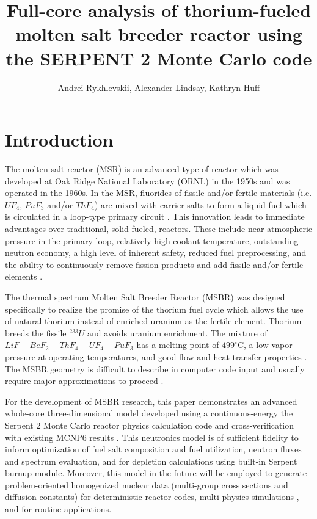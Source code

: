 \documentclass{anstrans}
\title{Full-core analysis of thorium-fueled molten salt breeder reactor using the SERPENT 2 Monte Carlo code}
\author{Andrei Rykhlevskii, Alexander Lindsay, Kathryn Huff}
\institute{
Department of Nuclear, Plasma, and Radiological Engineering, University of Illinois at Urbana-Champaign \break
Urbana, IL
}
\begin{document}
\section{Introduction}
The molten salt reactor (MSR) is an advanced type of reactor which was developed at Oak Ridge National Laboratory (ORNL) in the 1950s and was operated in the 1960s. In the MSR, fluorides of fissile and/or fertile materials (i.e. $UF_4$, $PuF_3$ and/or $ThF_4$) are mixed with carrier salts to form a liquid fuel which is circulated in a loop-type primary circuit \cite{haubenreich_experience_1970}. This innovation leads to immediate advantages over traditional, solid-fueled, reactors. These include near-atmospheric pressure in the primary loop, relatively high coolant temperature, outstanding neutron economy, a high level of inherent safety, reduced fuel preprocessing, and the ability to continuously remove fission products and add fissile and/or fertile elements \cite{leblanc_molten_2010}. 

The thermal spectrum Molten Salt Breeder Reactor (MSBR) was designed specifically to realize the promise of the thorium fuel cycle which allows the use of natural thorium instead of enriched uranium as the fertile element. Thorium breeds the fissile $^{233}U$ and avoids uranium enrichment. The mixture of $LiF-BeF_2-ThF_4-UF_4-PuF_3$ has a melting point of $499^\circ$C, a low vapor pressure at operating temperatures, and good flow and heat transfer properties \cite{robertson_conceptual_1971}. The MSBR geometry is difficult to describe in computer code input and usually require major approximations to proceed \cite{park_whole_2015}. 

For the development of MSBR research, this paper demonstrates an advanced whole-core three-dimensional model developed using a continuous-energy the Serpent 2 Monte Carlo reactor physics calculation code and cross-verification with existing MCNP6 results \cite{park_whole_2015,leppanen_serpent_2012}. This neutronics model is of sufficient fidelity to inform optimization of fuel salt composition and fuel utilization, neutron fluxes and spectrum evaluation, and for depletion calculations using built-in Serpent burnup module. Moreover, this model in the future will be employed to generate problem-oriented homogenized nuclear data (multi-group cross sections and diffusion constants) for deterministic reactor codes, multi-physics simulations \cite{fridman_use_2011,valtavirta_coupled_2017}, and for routine applications.
\end{document}
